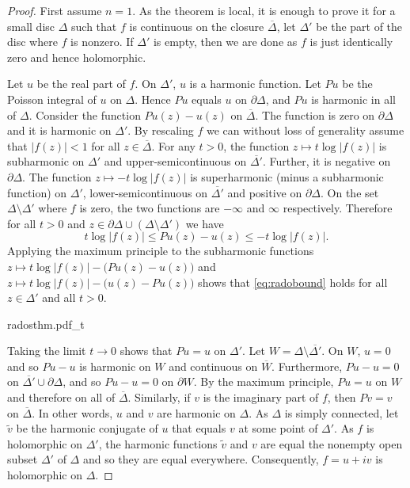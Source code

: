 \documentclass[12pt,openany]{book}
\newcommand{\abs}[1]{\left\lvert {#1} \right\rvert}
\theoremstyle{plain}
\theoremstyle{remark}
\theoremstyle{definition}
\newenvironment{myfig}{%
    \begin{center}
}{%
    \end{center}
}
\theoremstyle{exercise}
\theoremstyle{example}
\begin{document}
\begin{proof}
First assume $n=1$.  As the theorem is local, it is
enough to prove it for a small disc $\Delta$ such that $f$ is continuous
on the closure $\overline{\Delta}$, let $\Delta'$ be the part of the disc
where $f$ is nonzero.  If $\Delta'$ is empty, then we are done as
$f$ is just identically zero and hence holomorphic.


Let $u$ be the real part of $f$.  On $\Delta'$, $u$ is a harmonic function.
Let $Pu$ be the Poisson integral of $u$ on $\Delta$.  Hence $Pu$
equals $u$ on $\partial \Delta$, and $Pu$ is harmonic in all of $\Delta$.
Consider the function
$Pu(z) - u(z)$ on $\overline{\Delta}$.  The function is zero
on $\partial \Delta$ and it is harmonic on $\Delta'$.  By rescaling $f$
we can without loss of generality assume that $\abs{f(z)} < 1$ for all $z
\in \overline{\Delta}$.  For any $t >0$, the function 
$z \mapsto t \log \abs{f(z)}$ is subharmonic on $\Delta'$ and
upper-semicontinuous on $\overline{\Delta'}$.  Further, it is negative
on $\partial \Delta$.  The function $z \mapsto -t \log \abs{f(z)}$ is
superharmonic (minus a subharmonic function) on $\Delta'$,
lower-semicontinuous on $\overline{\Delta'}$ and positive on $\partial
\Delta$.  On the set $\Delta \setminus \Delta'$ where $f$ is zero, the two functions are $-\infty$ and
$\infty$ respectively.  Therefore for all $t > 0$ and 
$z \in \partial \Delta \cup (\Delta \setminus \Delta')$
we have
\begin{equation} \label{eq:radobound}
t \log \abs{f(z)} \leq Pu(z)-u(z) \leq -t \log \abs{f(z)}  .
\end{equation}
Applying the maximum principle to the subharmonic functions
$z \mapsto t \log \abs{f(z)} - \bigl(Pu(z)-u(z)\bigr)$
and
$z \mapsto t \log \abs{f(z)} - \bigl(u(z)-Pu(z)\bigr)$
shows that 
\eqref{eq:radobound} holds for all $z \in \Delta'$ and all $t > 0$.

\begin{myfig}
{radosthm.pdf_t}
\end{myfig}


Taking the limit
$t \to 0$ shows that $Pu = u$ on $\Delta'$.
Let $W = \Delta \setminus \overline{\Delta'}$.
On $W$, $u=0$ and so $Pu-u$ is harmonic on $W$
and continuous on $\overline{W}$.  Furthermore,
$Pu-u=0$ on $\overline{\Delta'} \cup \partial \Delta$,
and so $Pu-u=0$ on $\partial W$.  By the maximum principle, $Pu=u$ on $W$
and therefore on all of $\overline{\Delta}$.
Similarly, if $v$ is the imaginary part of $f$, then $Pv = v$ on
$\overline{\Delta}$.
In other words, $u$ and $v$ are harmonic on $\Delta$.
As $\Delta$ is simply connected,
let $\tilde{v}$ be the harmonic conjugate of $u$ that equals $v$ at
some point of $\Delta'$.  As $f$ is holomorphic on $\Delta'$,
the harmonic functions $\tilde{v}$ and $v$
are equal the nonempty open subset $\Delta'$ of $\Delta$ and so
they are equal everywhere.  Consequently, $f = u +iv$ is holomorphic on
$\Delta$.


\end{proof}
\end{document}
